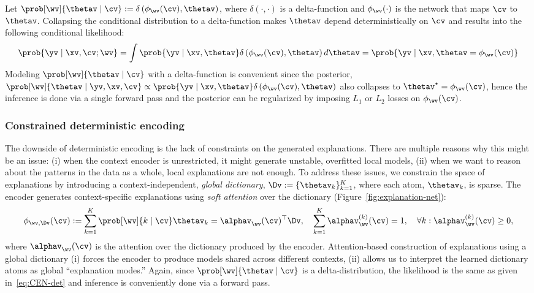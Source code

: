 \documentclass[twoside,11pt]{article}
\begin{document}
Let $\prob[\wv]{\thetav \mid \cv} := \delta\left(\phi_{\wv}(\cv), \thetav\right)$, where $\delta(\cdot, \cdot)$ is a delta-function and $\phi_{\wv}(\cdot)$ is the network that maps $\cv$ to $\thetav$.
Collapsing the conditional distribution to a delta-function makes $\thetav$ depend deterministically on $\cv$ and results into the following conditional likelihood:
\begin{equation}
    \label{eq:CEN-det}
    \prob{\yv \mid \xv, \cv; \wv}
    = \int \prob{\yv \mid \xv, \thetav} \delta\left(\phi_{\wv}(\cv), \thetav\right)d\thetav = \prob{\yv \mid \xv, \thetav = \phi_{\wv}(\cv)}
\end{equation}
Modeling $\prob[\wv]{\thetav \mid \cv}$ with a delta-function is convenient since the posterior, $\prob[\wv]{\thetav \mid \yv, \xv, \cv} \propto \prob{\yv \mid \xv, \thetav} \delta\left(\phi_{\wv}(\cv), \thetav\right)$ also collapses to $\thetav^\star = \phi_{\wv}(\cv)$, hence the inference is done via a single forward pass and the posterior can be regularized by imposing $L_1$ or $L_2$ losses on $\phi_{\wv}(\cv)$.


\subsubsection{Constrained deterministic encoding}
\label{sec:constrained-det-enc}

The downside of deterministic encoding is the lack of constraints on the generated explanations.
There are multiple reasons why this might be an issue:
(i) when the context encoder is unrestricted, it might generate unstable, overfitted local models,
(ii) when we want to reason about the patterns in the data as a whole, local explanations are not enough.
To address these issues, we constrain the space of explanations by introducing a context-independent, \emph{global dictionary}, $\Dv := \{\thetav_k\}_{k=1}^K$, where each atom, $\thetav_k$, is sparse.
The encoder generates context-specific explanations using \emph{soft attention} over the dictionary
(Figure~\ref{fig:explanation-net}):
\begin{equation}
    \label{eq:CEN-dict-enc}
    \begin{aligned}
        \phi_{\wv, \Dv}(\cv) := \sum_{k=1}^K \prob[\wv]{k \mid \cv} \thetav_k = \alphav_\wv(\cv)^\top \Dv, \quad
        \sum_{k=1}^K \alphav_\wv^{(k)}(\cv) = 1, \quad
        \forall k: \alphav_\wv^{(k)}(\cv) \geq 0,
    \end{aligned}
\end{equation}
where $\alphav_\wv(\cv)$ is the attention over the dictionary produced by the encoder.
Attention-based construction of explanations using a global dictionary (i) forces the encoder to produce models shared across different contexts, (ii) allows us to interpret the learned dictionary atoms as global ``explanation modes.''
Again, since $\prob[\wv]{\thetav \mid \cv}$ is a delta-distribution, the likelihood is the same as given in~\eqref{eq:CEN-det} and inference is conveniently done via a forward pass.
\end{document}
